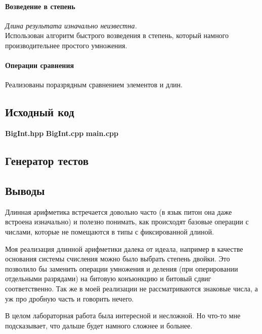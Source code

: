 \documentclass[12pt]{article}
\newcommand{\print}[1]{{\large  \bf  #1} {\scriptsize }}
\begin{document}
\paragraph{Возведение в степень} {\it Длина результата изначально неизвестна.}\\
Использован алгоритм быстрого возведения в степень, который намного производительнее простого умножения.

\paragraph{Операции сравнения} Реализованы поразрядным сравнением элементов и длин.

\subsection*{Исходный код}


\print{BigInt.hpp}
\print{BigInt.cpp}
\print{main.cpp} 

\subsection*{Генератор тестов}


\subsection*{Выводы}

Длинная арифметика встречается довольно часто (в язык питон она даже встроена изначально) и полезно понимать, как происходят базовые операции с числами, которые не помещаются в типы с фиксированной длиной.

Моя реализация длинной арифметики далека от идеала, например в качестве основания системы счисления можно было выбрать степень двойки. Это позволило бы заменить операции умножения и деления (при оперировании отдельными разрядами) на битовую конъюнкцию и битовый сдвиг соответственно. Так же в моей реализации не рассматриваются знаковые числа, а уж про дробную часть и говорить нечего. 

В целом лабораторная работа была интересной и несложной. Но что-то мне подсказывает, что дальше будет намного сложнее и больнее. 
\end{document}
